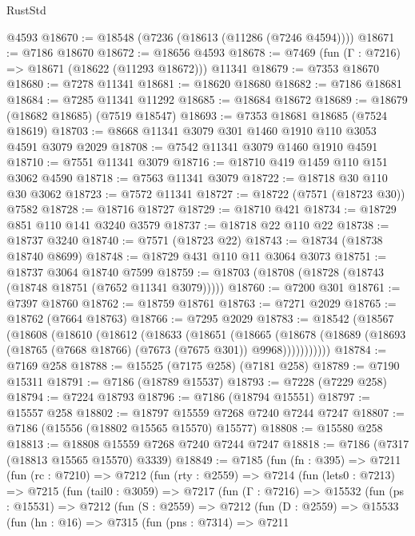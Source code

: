 \begin{lexlean}{RustStd}
\begin{coremodule}
{\begin{coremodule}
{{{{{{{{{{{{{{{{{{{{{{{{{{{{{{{{    @4593
@18670 := @18548 (@7236 (@18613 (@11286 (@7246 @4594))))
@18671 := @7186 @18670
@18672 := @18656 @4593
@18678 := @7469 (fun (Γ : @7216) => @18671 (@18622 (@11293 @18672))) @11341
@18679 := @7353 @18670
@18680 := @7278 @11341
@18681 := @18620 @18680
@18682 := @7186 @18681
@18684 := @7285 @11341 @11292
@18685 := @18684 @18672
@18689 := @18679 (@18682 @18685) (@7519 @18547)
@18693 := @7353 @18681 @18685 (@7524 @18619)
@18703 := @8668 @11341 @3079 @301 @1460 @1910 @110 @3053 @4591 @3079 @2029
@18708 := @7542 @11341 @3079 @1460 @1910 @4591
@18710 := @7551 @11341 @3079
@18716 := @18710 @419 @1459 @110 @151 @3062 @4590
@18718 := @7563 @11341 @3079
@18722 := @18718 @30 @110 @30 @3062
@18723 := @7572 @11341
@18727 := @18722 (@7571 (@18723 @30)) @7582
@18728 := @18716 @18727
@18729 := @18710 @421
@18734 := @18729 @851 @110 @141 @3240 @3579
@18737 := @18718 @22 @110 @22
@18738 := @18737 @3240
@18740 := @7571 (@18723 @22)
@18743 := @18734 (@18738 @18740 @8699)
@18748 := @18729 @431 @110 @11 @3064 @3073
@18751 := @18737 @3064 @18740 @7599
@18759 := @18703 (@18708 (@18728 (@18743 (@18748 @18751 (@7652 @11341 @3079)))))
@18760 := @7200 @301
@18761 := @7397 @18760
@18762 := @18759 @18761
@18763 := @7271 @2029
@18765 := @18762 (@7664 @18763)
@18766 := @7295 @2029
@18783 := @18542
    (@18567
      (@18608
        (@18610
          (@18612
            (@18633
              (@18651
                (@18665
                  (@18678
                    (@18689 (@18693 (@18765 (@7668 @18766) (@7673 (@7675 @301)) @9968)))))))))))
@18784 := @7169 @258
@18788 := @15525 (@7175 @258) (@7181 @258)
@18789 := @7190 @15311
@18791 := @7186 (@18789 @15537)
@18793 := @7228 (@7229 @258)
@18794 := @7224 @18793
@18796 := @7186 (@18794 @15551)
@18797 := @15557 @258
@18802 := @18797 @15559 @7268 @7240 @7244 @7247
@18807 := @7186 (@15556 (@18802 @15565 @15570) @15577)
@18808 := @15580 @258
@18813 := @18808 @15559 @7268 @7240 @7244 @7247
@18818 := @7186 (@7317 (@18813 @15565 @15570) @3339)
@18849 := @7185
    (fun (fn : @395) =>
    @7211
      (fun (rc : @7210) =>
      @7212
        (fun (rty : @2559) =>
        @7214
          (fun (lets0 : @7213) =>
          @7215
            (fun (tail0 : @3059) =>
            @7217
              (fun (Γ : @7216) =>
              @15532
                (fun (ps : @15531) =>
                @7212
                  (fun (S : @2559) =>
                  @7212
                    (fun (D : @2559) =>
                    @15533
                      (fun (hn : @16) =>
                      @7315
                        (fun (pns : @7314) =>
                        @7211
}}}}}}}}}}}}}}}}}}}}}}}}}}}}}}}}
\end{coremodule}}
\end{coremodule}
\end{lexlean}
